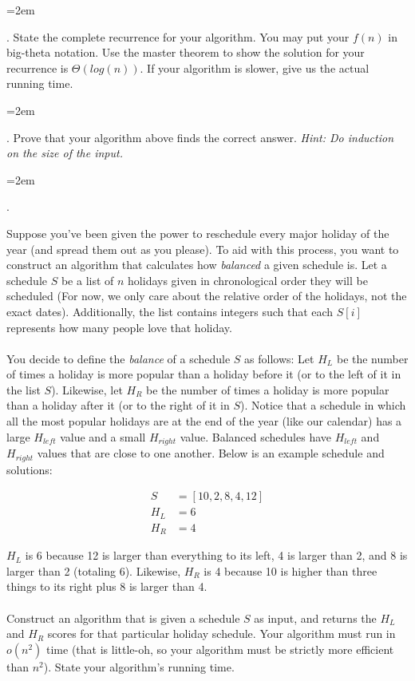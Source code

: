 \documentclass[12pt]{article}
\newcounter{quesnum}
\newcommand{\question}[2][??]{
\begin{list}{\labelitemi}{\leftmargin=2em}
\item [\arabic{quesnum}.] {} {#2}
\end{list}
\addtocounter{quesnum}{1}
}
\begin{document}
\question[3]{
State the complete recurrence for your algorithm. You may put your $f(n)$ in big-theta notation. Use the master theorem to show the solution for your recurrence is $\Theta(log(n))$. If your algorithm is slower, give us the actual running time.
}


\question[3]{
Prove that your algorithm above finds the correct answer. \emph{Hint: Do induction on the size of the input.}
}



\iffalse
\question[3]{
Suppose you've been given the power to reschedule every major holiday of the year (and spread them out as you please). To aid with this process, you want to construct an algorithm that calculates how \emph{balanced} a given schedule is. Let a schedule $S$ be a list of $n$ holidays given in chronological order they will be scheduled (For now, we only care about the relative order of the holidays, not the exact dates). Additionally, the list contains integers such that each $S[i]$ represents how many people love that holiday.\\
\\
You decide to define the \emph{balance} of a schedule $S$ as follows: Let $H_{L}$ be the number of times a holiday is more popular than a holiday before it (or to the left of it in the list $S$). Likewise, let $H_{R}$ be the number of times a holiday is more popular than a holiday after it (or to the right of it in $S$). Notice that a schedule in which all the most popular holidays are at the end of the year (like our calendar) has a large $H_{left}$ value and a small $H_{right}$ value. Balanced schedules have $H_{left}$ and $H_{right}$ values that are close to one another. Below is an example schedule and solutions:

\begin{align*}
S &= [10, 2, 8, 4, 12]\\
H_L &= 6\\
H_R &= 4
\end{align*}

$H_L$ is 6 because 12 is larger than everything to its left, 4 is larger than 2, and 8 is larger than 2 (totaling 6). Likewise, $H_R$ is 4 because 10 is higher than three things to its right plus 8 is larger than 4.\\
\\
Construct an algorithm that is given a schedule $S$ as input, and returns the $H_{L}$ and $H_{R}$ scores for that particular holiday schedule. Your algorithm must run in $o(n^2)$ time (that is little-oh, so your algorithm must be strictly more efficient than $n^2$). State your algorithm's running time.
}
\end{document}
